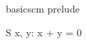 \documentclass{article}
\begin{document}
\begin{zsection}
\SECTION basicscm \parents prelude
\end{zsection}

\begin{schema}{S}
     x, y: \nat
\where
    x + y = 0
\end{schema}
\end{document}
